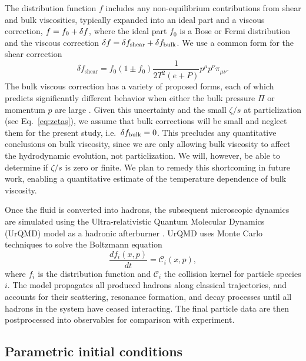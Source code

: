 \documentclass[aps,prc,reprint,amsmath,nofootinbib]{revtex4-1}
\begin{document}
The distribution function $f$ includes any non-equilibrium contributions from shear and bulk viscosities, typically expanded into an ideal part and a viscous correction, $f = f_0 + \delta f$, where the ideal part $f_0$ is a Bose or Fermi distribution and the viscous correction $\delta f = \delta f_\text{shear} + \delta f_\text{bulk}$.
We use a common form for the shear correction \cite{Teaney:2003kp}
\begin{equation}
  \delta f_\text{shear} = f_0(1 \pm f_0) \frac{1}{2T^2(e+P)} p^\mu p^\nu \pi_{\mu\nu}.
\end{equation}
The bulk viscous correction has a variety of proposed forms, each of which predicts significantly different behavior when either the bulk pressure $\Pi$ or momentum $p$ are large \cite{Dusling:2011fd, Noronha-Hostler:2013gga}.
Given this uncertainty and the small $\zeta/s$ at particlization (see Eq.~\eqref{eq:zetas}), we assume that bulk corrections will be small and neglect them for the present study, i.e.\ $\delta f_\text{bulk} = 0$.
This precludes any quantitative conclusions on bulk viscosity, since we are only allowing bulk viscosity to affect the hydrodynamic evolution, not particlization.
We will, however, be able to determine if $\zeta/s$ is zero or finite.
We plan to remedy this shortcoming in future work, enabling a quantitative estimate of the temperature dependence of bulk viscosity.

Once the fluid is converted into hadrons, the subsequent microscopic dynamics are simulated using the Ultra-relativistic Quantum Molecular Dynamics (UrQMD) model as a hadronic afterburner \cite{Bass:1998ca, Bleicher:1999xi}.
UrQMD uses Monte Carlo techniques to solve the Boltzmann equation
\begin{equation}
  \frac{df_i(x,p)}{dt} = \mathcal{C}_i(x, p),
\end{equation}
where $f_i$ is the distribution function and $\mathcal{C}_i$ the collision kernel for particle species $i$.
The model propagates all produced hadrons along classical trajectories, and accounts for their scattering, resonance formation, and decay processes until all hadrons in the system have ceased interacting.
The final particle data are then postprocessed into observables for comparison with experiment.

\subsection{Parametric initial conditions}
\end{document}
